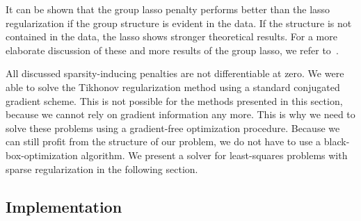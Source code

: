 It can be shown that the group lasso penalty performs better than the lasso
regularization if the group structure is evident in the data.
If the structure is not contained in the data, the lasso shows stronger
theoretical results.
For a more elaborate discussion of these and more results of the group lasso, we refer to~\cite{grouplasso-benefit}.

All discussed sparsity-inducing penalties are not differentiable at zero.
We were able to solve the Tikhonov regularization method using a standard
conjugated gradient scheme.
This is not possible for the methods presented in this section, because we cannot rely on gradient information any more.
This is why we need to solve these problems using a gradient-free optimization procedure.
Because we can still profit from the structure of our problem, we do not have to use a black-box-optimization algorithm.
We present a solver for least-squares problems with sparse regularization in the following section.


\FloatBarrier{}
\subsection{Implementation}

      


       
